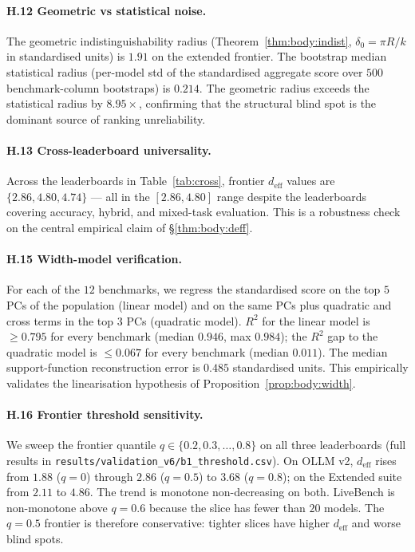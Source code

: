 \documentclass{article}
\begin{document}
\paragraph{H.12 Geometric vs statistical noise.}
The geometric indistinguishability radius (Theorem~\ref{thm:body:indist},
$\delta_0 = \pi R / k$ in standardised units) is $1.91$ on the
extended frontier. The bootstrap median statistical radius (per-model
std of the standardised aggregate score over $500$ benchmark-column
bootstraps) is $0.214$. The geometric radius exceeds the statistical
radius by $8.95\times$, confirming that the structural blind spot is
the dominant source of ranking unreliability.

\paragraph{H.13 Cross-leaderboard universality.}
Across the leaderboards in Table~\ref{tab:cross}, frontier
$d_{\mathrm{eff}}$ values are $\{2.86, 4.80, 4.74\}$ --- all in the
$[2.86, 4.80]$ range despite the leaderboards covering accuracy,
hybrid, and mixed-task evaluation. This is a robustness check on
the central empirical claim of \S\ref{thm:body:deff}.

\paragraph{H.15 Width-model verification.}
For each of the $12$ benchmarks, we regress the standardised score on
the top $5$ PCs of the population (linear model) and on the same PCs
plus quadratic and cross terms in the top $3$ PCs (quadratic model).
$R^2$ for the linear model is $\ge 0.795$ for every benchmark
(median $0.946$, max $0.984$); the $R^2$ gap to the quadratic model
is $\le 0.067$ for every benchmark (median $0.011$). The median
support-function reconstruction error is $0.485$ standardised units.
This empirically validates the linearisation hypothesis of
Proposition~\ref{prop:body:width}.

\paragraph{H.16 Frontier threshold sensitivity.}
We sweep the frontier quantile $q \in \{0.2, 0.3, \ldots, 0.8\}$ on
all three leaderboards (full results in
\texttt{results/validation\_v6/b1\_threshold.csv}). On OLLM v2,
$d_{\mathrm{eff}}$ rises from $1.88$ ($q=0$) through $2.86$ ($q=0.5$)
to $3.68$ ($q=0.8$); on the Extended suite from $2.11$ to $4.86$. The
trend is monotone non-decreasing on both. LiveBench is non-monotone
above $q = 0.6$ because the slice has fewer than $20$ models. The
$q = 0.5$ frontier is therefore conservative: tighter slices have
higher $d_{\mathrm{eff}}$ and worse blind spots.
\end{document}
